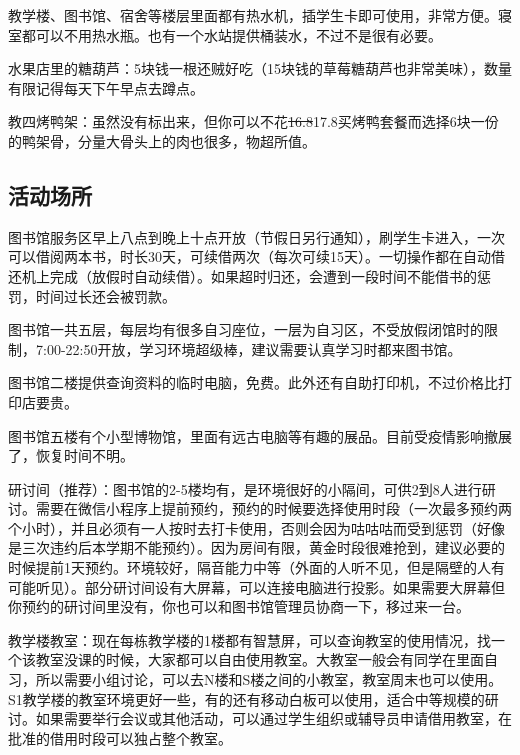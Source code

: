
教学楼、图书馆、宿舍等楼层里面都有热水机，插学生卡即可使用，非常方便。寝室都可以不用热水瓶。也有一个水站提供桶装水，不过不是很有必要。


水果店里的糖葫芦：5块钱一根还贼好吃（15块钱的草莓糖葫芦也非常美味），数量有限记得每天下午早点去蹲点。

教四烤鸭架：虽然没有标出来，但你可以不花\sout{16.8}17.8买烤鸭套餐而选择6块一份的鸭架骨，分量大骨头上的肉也很多，物超所值。

\subsection{活动场所}


图书馆服务区早上八点到晚上十点开放（节假日另行通知），刷学生卡进入，一次可以借阅两本书，时长30天，可续借两次（每次可续15天）。一切操作都在自动借还机上完成（放假时自动续借）。如果超时归还，会遭到一段时间不能借书的惩罚，时间过长还会被罚款。

图书馆一共五层，每层均有很多自习座位，一层为自习区，不受放假闭馆时的限制，7:00-22:50开放，学习环境超级棒，建议需要认真学习时都来图书馆。

图书馆二楼提供查询资料的临时电脑，免费。此外还有自助打印机，不过价格比打印店要贵。

图书馆五楼有个小型博物馆，里面有远古电脑等有趣的展品。目前受疫情影响撤展了，恢复时间不明。


研讨间（推荐）：图书馆的2-5楼均有，是环境很好的小隔间，可供2到8人进行研讨。需要在微信小程序上提前预约，预约的时候要选择使用时段（一次最多预约两个小时），并且必须有一人按时去打卡使用，否则会因为咕咕咕而受到惩罚（好像是三次违约后本学期不能预约）。因为房间有限，黄金时段很难抢到，建议必要的时候提前1天预约。环境较好，隔音能力中等（外面的人听不见，但是隔壁的人有可能听见）。部分研讨间设有大屏幕，可以连接电脑进行投影。如果需要大屏幕但你预约的研讨间里没有，你也可以和图书馆管理员协商一下，移过来一台。

教学楼教室：现在每栋教学楼的1楼都有智慧屏，可以查询教室的使用情况，找一个该教室没课的时候，大家都可以自由使用教室。大教室一般会有同学在里面自习，所以需要小组讨论，可以去N楼和S楼之间的小教室，教室周末也可以使用。S1教学楼的教室环境更好一些，有的还有移动白板可以使用，适合中等规模的研讨。如果需要举行会议或其他活动，可以通过学生组织或辅导员申请借用教室，在批准的借用时段可以独占整个教室。

